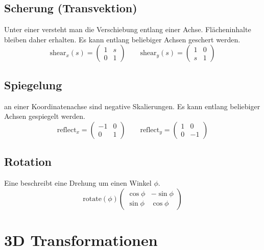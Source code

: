 \subsection{Scherung (Transvektion)}
Unter einer  versteht man die Verschiebung entlang einer Achse.
Flächeninhalte bleiben daher erhalten.
Es kann entlang beliebiger Achsen geschert werden.
\[
  \mathrm{shear}_x(s) =
  \begin{pmatrix}
    1 & s \\
    0 & 1
  \end{pmatrix}
  \qquad
  \mathrm{shear}_y(s) =
  \begin{pmatrix}
    1 & 0 \\
    s & 1
  \end{pmatrix}
\]

\subsection{Spiegelung}
 an einer Koordinatenachse sind negative Skalierungen.
Es kann entlang beliebiger Achsen gespiegelt werden.
\[
  \mathrm{reflect}_x =
  \begin{pmatrix}
    -1 & 0 \\
    0  & 1
  \end{pmatrix}
  \qquad
  \mathrm{reflect}_y =
  \begin{pmatrix}
    1 & 0 \\
    0 & -1
  \end{pmatrix}
\]

\subsection{Rotation}
Eine  beschreibt eine Drehung um einen Winkel $\phi$.
\[
  \mathrm{rotate}(\phi)
  \begin{pmatrix}
    \cos \phi & -\sin \phi \\
    \sin \phi & \cos \phi
  \end{pmatrix}
\]

\section{3D Transformationen}

